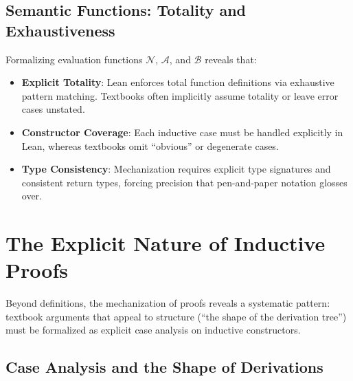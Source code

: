 \subsection*{Semantic Functions: Totality and Exhaustiveness}

Formalizing evaluation functions \(\mathcal{N}\), \(\mathcal{A}\), and
\(\mathcal{B}\) reveals that:


\begin{itemize}
    \item \textbf{Explicit Totality}:
    Lean enforces total function definitions via exhaustive pattern matching.
    Textbooks often implicitly assume totality or leave error cases unstated.
    
    \item \textbf{Constructor Coverage}:
    Each inductive case must be handled explicitly in Lean, whereas textbooks
    omit ``obvious'' or degenerate cases.
    
    \item \textbf{Type Consistency}:
    Mechanization requires explicit type signatures and consistent return types,
    forcing precision that pen-and-paper notation glosses over.
\end{itemize}

%
%
%
\section{The Explicit Nature of Inductive Proofs}
\label{discussion:sec:inductive_proofs}

Beyond definitions, the mechanization of proofs reveals a systematic pattern:
textbook arguments that appeal to structure
(``the shape of the derivation tree'') must be formalized as explicit case
analysis on inductive constructors.

\subsection*{Case Analysis and the Shape of Derivations}

